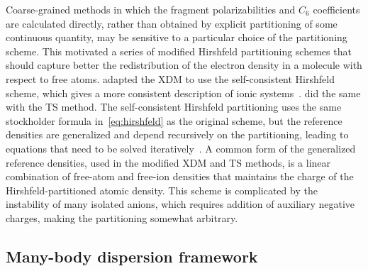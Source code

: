 Coarse-grained methods in which the fragment polarizabilities and $C_6$ coefficients are calculated directly, rather than obtained by explicit partitioning of some continuous quantity, may be sensitive to a particular choice of the partitioning scheme.
This motivated a series of modified Hirshfeld partitioning schemes that should capture better the redistribution of the electron density in a molecule with respect to free atoms.
\citet{SteinmannJCTC10,SteinmannJCTC11} adapted the XDM to use the self-consistent Hirshfeld scheme, which gives a more consistent description of ionic systems~\cite{BultinckJCP07}.
\citet{BuckoJCTC13,BuckoJCP14} did the same with the TS method.
The self-consistent Hirshfeld partitioning uses the same stockholder formula in~\eqref{eq:hirshfeld} as the original scheme, but the reference densities are generalized and depend recursively on the partitioning, leading to equations that need to be solved iteratively~\cite{VerstraelenJCTC12}.
A common form of the generalized reference densities, used in the modified XDM and TS methods, is a linear combination of free-atom and free-ion densities that maintains the charge of the Hirshfeld-partitioned atomic density.
This scheme is complicated by the instability of many isolated anions, which requires addition of auxiliary negative charges, making the partitioning somewhat arbitrary.

\subsection{Many-body dispersion framework}\label{sec:mbd}

